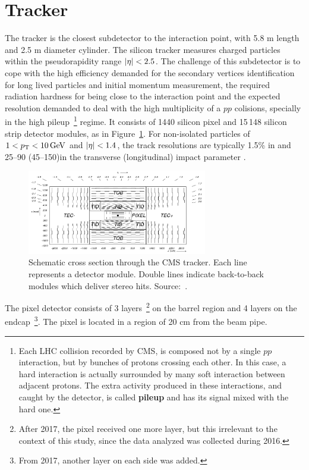 
\section{Tracker}

The tracker is the closest subdetector to the interaction point, with 5.8 m length and 2.5 m diameter cylinder. The silicon tracker measures charged particles within the pseudorapidity range $\lvert \eta \rvert < 2.5$. The challenge of this subdetector is to cope with the high efficiency demanded for the secondary vertices identification for long lived particles and initial momentum measurement, the required radiation hardness for being close to the interaction point and the expected resolution demanded to deal with the high multiplicity of a $pp$ colisions, specially in the high pileup~\footnote{Each LHC collision recorded by CMS, is composed not by a single $pp$ interaction, but by bunches of protons crossing each other. In this case, a hard interaction is actually surrounded by many soft interaction between adjacent protons. The extra activity produced in these interactions, and caught by the detector, is called \textbf{pileup} and has its signal mixed with the hard one.} regime. It consists of 1440 silicon pixel and 15\,148 silicon strip detector modules, as in Figure~\ref{cms_tracker}. For non-isolated particles of $1 < p_{\mathrm{T}} < 10\,\text{Ge\hspace{-.08em}V}$ and $\lvert \eta \rvert < 1.4$, the track resolutions are typically 1.5\% in \pt and 25--90 (45--150)\mum in the transverse (longitudinal) impact parameter \cite{TRK-11-001}.

\begin{figure}[htbp]
    \centering
    \includegraphics[width=0.7\textwidth]{figures_and_tables/experimental_setup/tracker.png}
    \caption{ Schematic cross section through the CMS tracker. Each line represents a detector
    module. Double lines indicate back-to-back modules which deliver stereo hits. Source:~\cite{Chatrchyan:2008zzk}.}
    \label{cms_tracker}
\end{figure}

The pixel detector consists of 3 layers~\footnote{After 2017, the pixel received one more layer, but this irrelevant to the context of this study, since the data analyzed was collected during 2016.} on the barrel region and 4 layers on the endcap~\footnote{From 2017, another layer on each side was added.}. The pixel is located in a region of 20 cm from the beam pipe.

